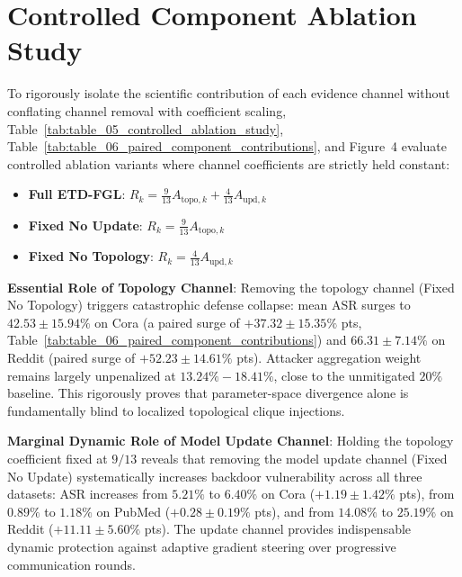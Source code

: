 \section{Controlled Component Ablation Study}
\label{sec:controlled_ablation}
To rigorously isolate the scientific contribution of each evidence channel without conflating channel removal with coefficient scaling, Table~\ref{tab:table_05_controlled_ablation_study}, Table~\ref{tab:table_06_paired_component_contributions}, and Figure~4 evaluate controlled ablation variants where channel coefficients are strictly held constant:
\begin{itemize}
    \item \textbf{Full \textsc{ETD-FGL}}: $R_k = \frac{9}{13} A_{\text{topo},k} + \frac{4}{13} A_{\text{upd},k}$
    \item \textbf{Fixed No Update}: $R_k = \frac{9}{13} A_{\text{topo},k}$
    \item \textbf{Fixed No Topology}: $R_k = \frac{4}{13} A_{\text{upd},k}$
\end{itemize}

\textbf{Essential Role of Topology Channel}:
Removing the topology channel (Fixed No Topology) triggers catastrophic defense collapse: mean ASR surges to $42.53 \pm 15.94\%$ on Cora (a paired surge of $+37.32 \pm 15.35\%$ pts, Table~\ref{tab:table_06_paired_component_contributions}) and $66.31 \pm 7.14\%$ on Reddit (paired surge of $+52.23 \pm 14.61\%$ pts). Attacker aggregation weight remains largely unpenalized at $13.24\% - 18.41\%$, close to the unmitigated $20\%$ baseline. This rigorously proves that parameter-space divergence alone is fundamentally blind to localized topological clique injections.

\textbf{Marginal Dynamic Role of Model Update Channel}:
Holding the topology coefficient fixed at $9/13$ reveals that removing the model update channel (Fixed No Update) systematically increases backdoor vulnerability across all three datasets:
ASR increases from $5.21\%$ to $6.40\%$ on Cora ($+1.19 \pm 1.42\%$ pts),
from $0.89\%$ to $1.18\%$ on PubMed ($+0.28 \pm 0.19\%$ pts),
and from $14.08\%$ to $25.19\%$ on Reddit ($+11.11 \pm 5.60\%$ pts).
The update channel provides indispensable dynamic protection against adaptive gradient steering over progressive communication rounds.
